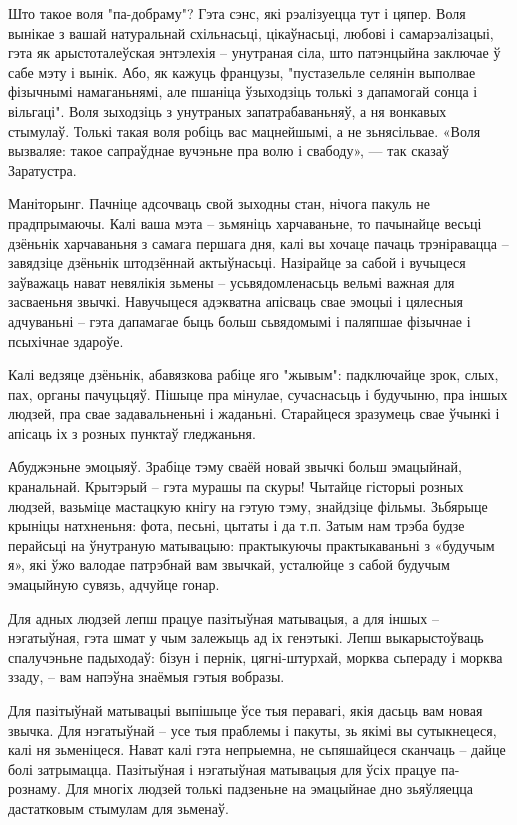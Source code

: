 Што такое воля "па-добраму"? Гэта сэнс, які рэалізуецца тут і цяпер. Воля вынікае з вашай натуральнай схільнасьці, цікаўнасьці, любові і самарэалізацыі, гэта як арыстоталеўская энтэлехія – унутраная сіла, што патэнцыйна заключае ў сабе мэту і вынік. Або, як кажуць французы, "пустазельле селянін выполвае фізычнымі намаганьнямі, але пшаніца ўзыходзіць толькі з дапамогай сонца і вільгаці". Воля зыходзіць з унутраных запатрабаваньняў, а ня вонкавых стымулаў. Толькі такая воля робіць вас мацнейшымі, а не зьнясільвае. «Воля вызваляе: такое сапраўднае вучэньне пра волю і свабоду», — так сказаў Заратустра.

Маніторынг. Пачніце адсочваць свой зыходны стан, нічога пакуль не прадпрымаючы. Калі ваша мэта – зьмяніць харчаваньне, то пачынайце весьці дзёньнік харчаваньня з самага першага дня, калі вы хочаце пачаць трэніравацца – завядзіце дзёньнік штодзённай актыўнасьці. Назірайце за сабой і вучыцеся заўважаць нават невялікія зьмены – усьвядомленасьць вельмі важная для засваеньня звычкі. Навучыцеся адэкватна апісваць свае эмоцыі і цялесныя адчуваньні – гэта дапамагае быць больш сьвядомымі і паляпшае фізычнае і псыхічнае здароўе.

Калі ведзяце дзёньнік, абавязкова рабіце яго "жывым": падключайце зрок, слых, пах, органы пачуцьцяў. Пішыце пра мінулае, сучаснасьць і будучыню, пра іншых людзей, пра свае задавальненьні і жаданьні. Старайцеся зразумець свае ўчынкі і апісаць іх з розных пунктаў гледжаньня.

Абуджэньне эмоцыяў. Зрабіце тэму сваёй новай звычкі больш эмацыйнай, кранальнай. Крытэрый – гэта мурашы па скуры! Чытайце гісторыі розных людзей, вазьміце мастацкую кнігу на гэтую тэму, знайдзіце фільмы. Зьбярыце крыніцы натхненьня: фота, песьні, цытаты і да т.п. Затым нам трэба будзе перайсьці на ўнутраную матывацыю: практыкуючы практыкаваньні з «будучым я», які ўжо валодае патрэбнай вам звычкай, усталюйце з сабой будучым эмацыйную сувязь, адчуйце гонар.

Для адных людзей лепш працуе пазітыўная матывацыя, а для іншых – нэгатыўная, гэта шмат у чым залежыць ад іх генэтыкі. Лепш выкарыстоўваць спалучэньне падыходаў: бізун і пернік, цягні-штурхай, морква сьпераду і морква ззаду, – вам напэўна знаёмыя гэтыя вобразы.

Для пазітыўнай матывацыі выпішыце ўсе тыя перавагі, якія дасьць вам новая звычка. Для нэгатыўнай – усе тыя праблемы і пакуты, зь якімі вы сутыкнецеся, калі ня зьменіцеся. Нават калі гэта непрыемна, не сьпяшайцеся сканчаць – дайце болі затрымацца. Пазітыўная і нэгатыўная матывацыя для ўсіх працуе па-рознаму. Для многіх людзей толькі падзеньне на эмацыйнае дно зьяўляецца дастатковым стымулам для зьменаў.

